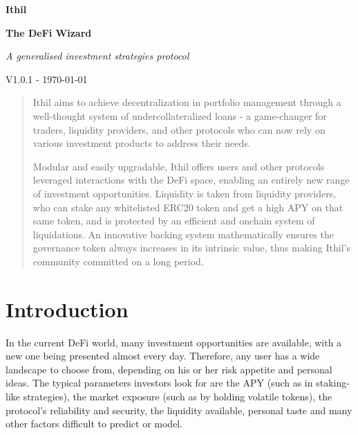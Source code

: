 \documentclass[a4paper,10 pt]{article}
\theoremstyle{definition}
\begin{document}
\begin{titlepage}
    \begin{center}
        \vspace*{1cm}
            
        \Huge
        \textbf{Ithil}

        \vspace{0.5cm}
        \Large
        {\bf The DeFi Wizard}

        \vspace{1cm}
        \Large
        {\it A generalised investment strategies protocol}

        \vspace{1.5cm}
        {\normalsize V1.0.1 - \today}
        \vspace{1.0cm}

        \begin{abstract}        
        Ithil aims to achieve decentralization in portfolio management through a well-thought system of undercollateralized loans - a game-changer for traders, liquidity providers, and other protocols who can now rely on various investment products to address their needs. 
        
        Modular and easily upgradable, Ithil offers users and other protocols leveraged interactions with the DeFi space, enabling an entirely new range of investment opportunities. Liquidity is taken from liquidity providers, who can stake any whitelisted ERC20 token and get a high APY on that same token, and is protected by an efficient and onchain system of liquidations. An innovative backing system mathematically ensures the governance token always increases in its intrinsic value, thus making Ithil's community committed on a long period.
        \end{abstract}
            
    \end{center}
\tableofcontents
\end{titlepage}

\section{Introduction}

In the current DeFi world, many investment opportunities are available, with a new one being presented almost every day. Therefore, any user has a wide landscape to choose from, depending on his or her risk appetite and personal ideas. The typical parameters investors look for are the APY (such as in staking-like strategies), the market exposure (such as by holding volatile tokens), the protocol's reliability and security, the liquidity available, personal taste and many other factors difficult to predict or model.
\end{document}
